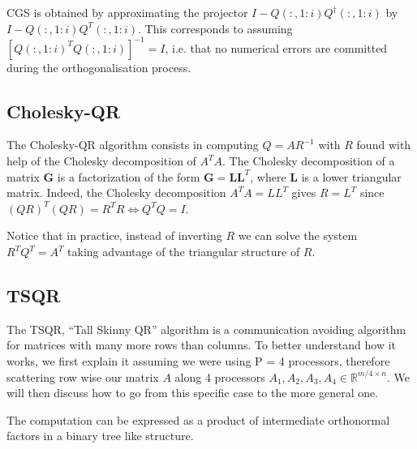 \documentclass[a4paper, 12pt,oneside]{article}
\begin{document}
			CGS is obtained by approximating the projector $I-Q(:,1:i)Q^\dagger(:,1:i)$ by $I-Q(:,1:i)Q^T(:,1:i)$. This corresponds to assuming $[Q(:,1:i)^TQ(:,1:i)]^{-1}=I$, i.e. that no numerical errors are committed during the orthogonalisation process. 
		\subsection{Cholesky-QR}
			The Cholesky-QR algorithm consists in computing $Q=AR^{-1}$ with $R$ found with help of the Cholesky decomposition of $A^TA$. The Cholesky decomposition of a matrix $\mathbf{G}$ is a factorization of the form $\mathbf{G} = \mathbf{L} \mathbf{L}^T$, where $\mathbf{L}$ is a lower triangular matrix. Indeed, the Cholesky decomposition $A^TA=LL^T$ gives $R=L^T$ since $(QR)^T(QR)=R^TR\iff Q^TQ=I$. 
			
			Notice that in practice, instead of inverting $R$ we can solve the system $R^TQ^T=A^T$ taking advantage of the triangular structure of $R$.
		\subsection{TSQR}
		The TSQR, ``Tall Skinny QR'' algorithm is a communication avoiding algorithm for matrices with many more rows than columns. 
		To better understand how it works, we first explain it assuming we were using P = 4 processors, therefore scattering row wise our matrix $A$ along 4 processors $A_1, A_2, A_3, A_4 \in \mathbb{R}^{m / 4 \times n}$. We will then discuss how to go from this specific case to the more general one. 
		
		The computation can be expressed as a product of intermediate orthonormal factors in a binary tree like structure.
\end{document}
